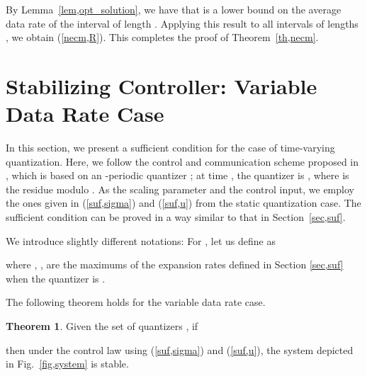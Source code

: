 \documentclass[a4paper, 11pt]{article}
\theoremstyle{definition}
\newtheorem{thm}{Theorem}
\newcommand{\fref}[1]{Fig.~\ref{#1}}
\begin{document}
By Lemma~\ref{lem,opt_solution}, we have that 
is a lower bound on the average data rate of the interval of length .
Applying this result to all intervals of lengths ,
we obtain (\ref{necm,R}).
This completes the proof of Theorem~\ref{th,necm}.


\section{Stabilizing Controller: Variable Data Rate Case}\label{sec,averagesuf}
In this section, we present a sufficient condition for the case of time-varying
quantization.
Here, we follow the control and communication scheme proposed in \cite{Tatikonda2004},
which is based on an -periodic quantizer ;
at time , the quantizer is , where 
is the residue modulo .
As the scaling parameter and the control input, we employ the ones
given in (\ref{suf,sigma}) and (\ref{suf,u}) from the static quantization case.
The sufficient condition can be proved in a way similar to that in Section~\ref{sec,suf}.

We introduce slightly different notations:
For , let us define  as

where , , are
the maximums  of the expansion rates defined in Section \ref{sec,suf}
when the quantizer is .

The following theorem holds for the variable data rate case.
\begin{thm}\label{th,suf_m}
 Given the set of quantizers , if

then under the control law using (\ref{suf,sigma}) and (\ref{suf,u}),
the system depicted in \fref{fig,system} is stable.
\end{thm}
\end{document}
